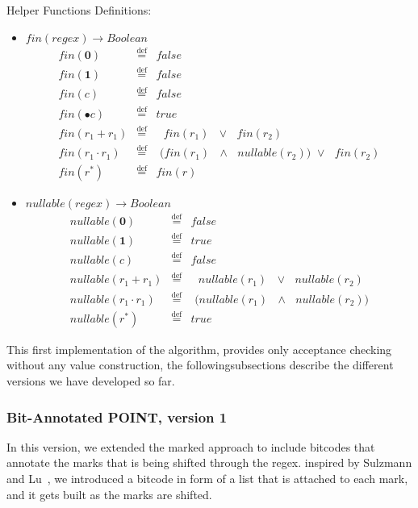 \documentclass[12pt]{article}
\begin{document}
Helper Functions Definitions:
\begin{itemize}
\item $fin(regex) \rightarrow Boolean $
  \[
\begin{array}{rcl}
  fin(\textbf{0})              & \stackrel{\text{def}}{=} & false \\
  fin(\textbf{1})              & \stackrel{\text{def}}{=} & false \\
  fin(c)              & \stackrel{\text{def}}{=} & false \\
  fin(\bullet c)      & \stackrel{\text{def}}{=} & true \\
  fin(r_1 + r_1)      & \stackrel{\text{def}}{=} & \text{ $fin(r_1)$ $\lor$ $fin(r_2)$}\\ 
  fin(r_1 \cdot r_1)  & \stackrel{\text{def}}{=} & \text{ ($fin(r_1)$ $\land$ $nullable(r_2)$) $\lor$ $fin(r_2)$}\\
  fin(r^*)            & \stackrel{\text{def}}{=} & fin(r)  
\end{array}
\]

\item $nullable(regex) \rightarrow Boolean $
  \[
\begin{array}{rcl}
  nullable(\textbf{0})         & \stackrel{\text{def}}{=} & false \\
  nullable(\textbf{1})              & \stackrel{\text{def}}{=} & true \\
  nullable(c)              & \stackrel{\text{def}}{=} & false \\
  nullable(r_1 + r_1)      & \stackrel{\text{def}}{=} & \text{ $nullable(r_1)$ $\lor$ $nullable(r_2)$}\\ 
  nullable(r_1 \cdot r_1)      & \stackrel{\text{def}}{=} & \text{ ($nullable(r_1)$ $\land$ $nullable(r_2)$)}\\
  nullable(r^*)      & \stackrel{\text{def}}{=} & true 
\end{array}
\]

\end{itemize}
This first implementation of the algorithm, provides only acceptance checking without any value construction, 
the followingsubsections describe the different versions we have developed so far.

\subsubsection{Bit-Annotated POINT, version 1}
In this version, we extended the marked approach to include bitcodes that annotate the marks that is being 
shifted through the regex. inspired by Sulzmann and Lu~\cite{Sulzmann2014}, we introduced a bitcode in form 
of a list that is attached to each mark, and it gets built as the marks are shifted. 
\end{document}
